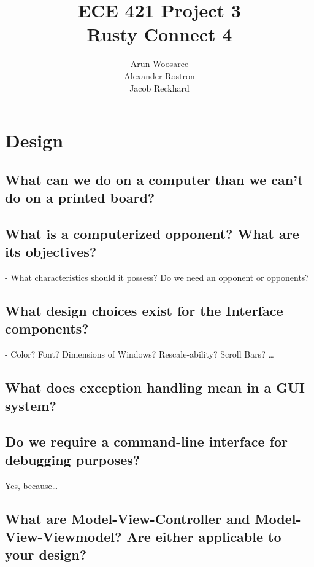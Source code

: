 \documentclass[letterpaper]{article}
\title{ECE 421 Project 3\\
Rusty Connect 4}
\author{Arun Woosaree\\
Alexander Rostron\\
Jacob Reckhard
}
\begin{document}
\maketitle %


\section{Design}
\subsection{What can we do on a computer than we can’t do on a printed board?}

\subsection{What is a computerized opponent? What are its objectives?}
- What characteristics should it possess? Do we need an opponent or opponents?


\subsection{What design choices exist for the Interface components?}
- Color? Font? Dimensions of Windows? Rescale-ability? Scroll Bars? \dots

\subsection{What does exception handling mean in a GUI system?}

\subsection{Do we require a command-line interface for debugging purposes?}
Yes, because\dots

\subsection{What are Model-View-Controller and Model-View-Viewmodel? Are either applicable to your
design?}
\end{document}

